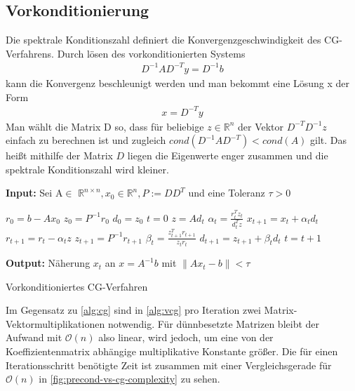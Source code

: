 \documentclass[12pt,a4paper]{scrartcl}
\numberwithin{equation}{section}
\numberwithin{myalgctr}{section}
\numberwithin{mytheoremctr}{subsection}
\numberwithin{mykorollarctr}{subsection}
\numberwithin{mylemmactr}{subsection}
\numberwithin{mybeispielctr}{subsection}
\newcommand\norm[1]{\left\lVert#1\right\rVert}
\begin{document}
	\subsection{Vorkonditionierung}
	Die spektrale Konditionszahl definiert die Konvergenzgeschwindigkeit des CG-Verfahrens. Durch lösen des vorkonditionierten Systems
	\begin{align*}
		D^{-1}AD^{-T}y = D^{-1}b
	\end{align*}
	kann die Konvergenz beschleunigt werden und man bekommt eine Lösung x der Form 
	\begin{align*}
		x = D^{-T}y
	\end{align*}
	Man wählt die Matrix D so, dass für beliebige $z \in \mathbb{R}^{n}$ der Vektor $D^{-T}D^{-1}z$ einfach zu berechnen ist und zugleich $cond(D^{-1}AD^{-T}) < cond(A)$ gilt. Das heißt mithilfe der Matrix $D$ liegen die Eigenwerte enger zusammen und die spektrale Konditionszahl wird kleiner. 
	\begin{algorithm}[H]
		\textbf{Input:} Sei A$\in$ $\mathbb{R}^{n\times n}, x_0 \in \mathbb{R}^{n}, P:=DD^{T}$ und eine Toleranz $\tau > 0$
		\begin{algorithmic}[1]
			\State $r_0 = b - Ax_0$
			\State $z_0 = P^{-1}r_0$
			\State $d_0 = z_0$
			\State $t = 0$
			\While{$ \norm{r_t} > \tau $}
			\State $z = Ad_t$
			\State $\alpha_t = \frac{r_t^{T}z_t}{d_t^{T}z}$
			\State $x_{t+1} = x_{t} + \alpha_t d_t$
			\State $r_{t+1} = r_t - \alpha_t z$
			\State $z_{t+1} = P^{-1}r_{t+1}$
			\State $\beta_t = \frac{z_{t+1}^{T}r_{t+1}}{z_tr_t}$
			\State $d_{t+1} = z_{t+1} + \beta_td_t$
			\State $t = t + 1$
			\EndWhile
		\end{algorithmic}
		\textbf{Output:} Näherung $x_t$ an $x = A^{-1}b$ mit $\norm{Ax_t-b} < \tau$
		
		\caption{Vorkonditioniertes CG-Verfahren} \label{alg:vcg}
	\end{algorithm}

	Im Gegensatz zu \cref{alg:cg}  sind in \cref{alg:vcg} pro Iteration zwei Matrix-Vektormultiplikationen notwendig. F\"ur d\"unnbesetzte Matrizen bleibt der Aufwand mit $\mathcal{O}(n)$ also linear, wird jedoch, um eine  von der Koeffizientenmatrix abh\"angige multiplikative Konstante gr\"o\ss er. Die f\"ur einen Iterationsschritt ben\"otigte Zeit ist zusammen mit einer Vergleichsgerade f\"ur $\mathcal{O}(n)$ in \cref{fig:precond-vs-cg-complexity} zu sehen. 
	
\end{document}

